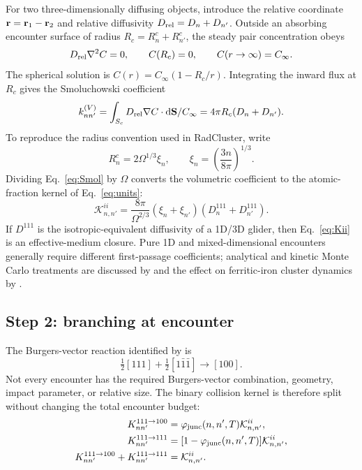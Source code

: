 \documentclass[11pt,a4paper]{article}
\newcommand{\K}{\mathcal K}
\newcommand{\half}{\tfrac12}
\newcommand{\dd}{\mathrm d}
\newcommand{\rc}{\textsf{RadCluster}}
\begin{document}
For two three-dimensionally diffusing objects, introduce the relative
coordinate ${\bf r}={\bf r}_1-{\bf r}_2$ and relative diffusivity
$D_{\rm rel}=D_n+D_{n'}$.  Outside an absorbing encounter surface of radius
$R_c=R_n^c+R_{n'}^c$, the steady pair concentration obeys
\begin{equation}
 D_{\rm rel}\nabla^2 C=0,\qquad C(R_c)=0,\qquad C(r\rightarrow\infty)=C_\infty. \label{eq:Laplace}
\end{equation}
The spherical solution is $C(r)=C_\infty(1-R_c/r)$.  Integrating the inward
flux at $R_c$ gives the Smoluchowski coefficient
\begin{equation}
 k_{nn'}^{(V)}=\int_{S_c}D_{\rm rel}\nabla C\cdot\dd{\bf S}/C_\infty
 =4\pi R_c(D_n+D_{n'}).                                                \label{eq:Smol}
\end{equation}
To reproduce the radius convention used in \rc{}, write
\begin{equation}
 R_n^c=2\Omega^{1/3}\xi_n,\qquad
 \xi_n=\left(\frac{3n}{8\pi}\right)^{1/3}.                            \label{eq:xi}
\end{equation}
Dividing Eq.~\eqref{eq:Smol} by $\Omega$ converts the volumetric coefficient to
the atomic-fraction kernel of Eq.~\eqref{eq:units}:
\begin{equation}
 \boxed{
 \K^{ii}_{n,n'}=\frac{8\pi}{\Omega^{2/3}}
 (\xi_n+\xi_{n'})(D_n^{111}+D_{n'}^{111}).}                            \label{eq:Kii}
\end{equation}
If $D^{111}$ is the isotropic-equivalent diffusivity of a 1D/3D glider, then
Eq.~\eqref{eq:Kii} is an effective-medium closure.  Pure 1D and mixed-dimensional
encounters generally require different first-passage coefficients; analytical
and kinetic Monte Carlo treatments are discussed by \citet{HuangMarian2019}
and the effect on ferritic-iron cluster dynamics by \citet{KohnertWirth2015}.

\subsection{Step 2: branching at encounter}

The Burgers-vector reaction identified by \citet{MarianWirth2002} is
\begin{equation}
 \half[111]+\half[1\bar1\bar1]\longrightarrow[100].                  \label{eq:bvec}
\end{equation}
Not every encounter has the required Burgers-vector combination, geometry,
impact parameter, or relative size.  The binary collision kernel is therefore
split without changing the total encounter budget:
\begin{align}
 K_{nn'}^{111\rightarrow100}&=\varphi_{\rm junc}(n,n',T)\K^{ii}_{n,n'}, \label{eq:Kjunc}\\
 K_{nn'}^{111\rightarrow111}&=[1-\varphi_{\rm junc}(n,n',T)]\K^{ii}_{n,n'}, \label{eq:Kself}\\
 K_{nn'}^{111\rightarrow100}+K_{nn'}^{111\rightarrow111}&=\K^{ii}_{n,n'}. \label{eq:budget}
\end{align}
\end{document}
